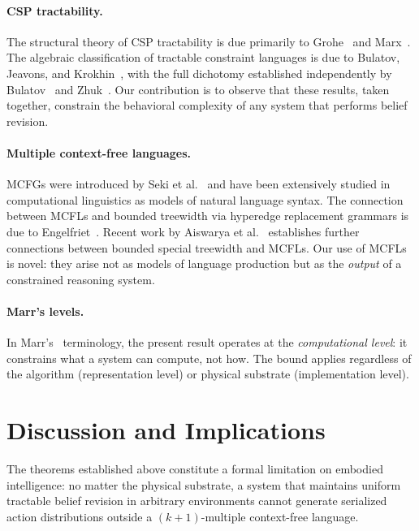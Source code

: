\documentclass[11pt,a4paper]{article}
\theoremstyle{plain}
\theoremstyle{definition}
\theoremstyle{remark}
\begin{document}
\paragraph{CSP tractability.}
The structural theory of CSP tractability is due primarily to Grohe~\cite{Grohe07} and Marx~\cite{Marx10}.
The algebraic classification of tractable constraint languages is due to Bulatov, Jeavons, and Krokhin~\cite{BJK05}, with the full dichotomy established independently by Bulatov~\cite{Bulatov17} and Zhuk~\cite{Zhuk20}.
Our contribution is to observe that these results, taken together, constrain the behavioral complexity of any system that performs belief revision.

\paragraph{Multiple context-free languages.}
MCFGs were introduced by Seki et al.~\cite{Seki91} and have been extensively studied in computational linguistics as models of natural language syntax.
The connection between MCFLs and bounded treewidth via hyperedge replacement grammars is due to Engelfriet~\cite{Engelfriet97}.
Recent work by Aiswarya et al.~\cite{Aiswarya26} establishes further connections between bounded special treewidth and MCFLs.
Our use of MCFLs is novel: they arise not as models of language production but as the \emph{output} of a constrained reasoning system.

\paragraph{Marr's levels.}
In Marr's~\cite{Marr82} terminology, the present result operates at the \emph{computational level}: it constrains what a system can compute, not how.
The bound applies regardless of the algorithm (representation level) or physical substrate (implementation level).

\section{Discussion and Implications}\label{sec:discussion}

The theorems established above constitute a formal limitation on embodied intelligence: no matter the physical substrate, a system that maintains uniform tractable belief revision in arbitrary environments cannot generate serialized action distributions outside a $(k{+}1)$-multiple context-free language.
\end{document}
